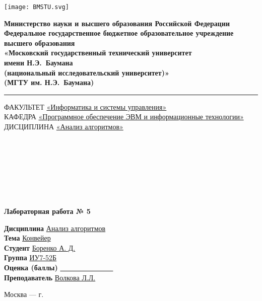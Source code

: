 
\begin{titlepage}
    


    \noindent \begin{minipage}{0.20\textwidth}
        \texttt{[image: BMSTU.svg]}
    \end{minipage}
    \noindent\begin{minipage}{0.8\textwidth}\centering \singlespacing\small
        \textbf{Министерство науки и высшего образования Российской Федерации}\\
        \textbf{Федеральное государственное бюджетное образовательное учреждение высшего образования}\\
        \textbf{«Московский государственный технический университет \\ имени Н.Э.~Баумана}\\
        \textbf{(национальный исследовательский университет)»}\\
        \textbf{(МГТУ им. Н.Э.~Баумана)}
    \end{minipage}
    
    \noindent\rule{18cm}{3pt}


    \begin{flushleft}
    \small{ФАКУЛЬТЕТ \underline{«Информатика и системы управления»}\\    
    КАФЕДРА \underline{«Программное обеспечение ЭВМ и информационные технологии»}}\\
    ДИСЦИПЛИНА \underline{«Анализ алгоритмов»}
    \end{flushleft}

    \
    
    \ 
    
    \ 
    
    \ 
    
    \begin{center}
        \Large\textbf{Лабораторная работа № 5}
    \end{center}


    \begin{flushleft}
        \textbf{Дисциплина} \underline{Анализ алгоритмов}\\
        \textbf{Тема} \underline{Конвейер}\\
        \textbf{Студент} \underline{Боренко А. Д.}\\
        \textbf{Группа} \underline{ИУ7-52Б}\\
        \textbf{Оценка (баллы)} \underline{~~~~~~~~~~~~~~~}\\
        \textbf{Преподаватель} \underline{Волкова Л.Л.}
    \end{flushleft}
    
        
    \begin{center}
        \vfill
        Москва --- \the\year г.
    \end{center}

\end{titlepage}

\setcounter{page}{2} 

\tableofcontents 